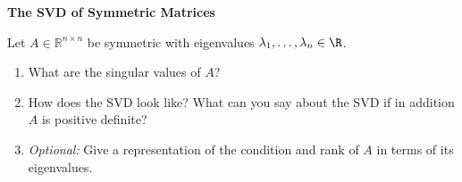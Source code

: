 \textbf{\normalsize The SVD of Symmetric Matrices}

Let $A\in \mathbb{R}^{n\times n}$ be symmetric with eigenvalues $\lambda_1, \ldots, \lambda_n \in \R$.
\begin{enumerate}
	\item What are the singular values of $A$?
	\item How does the SVD look like? What can you say about the SVD if in addition $A$ is positive definite?
	\item \textit{Optional:} Give a representation of the condition and rank of $A$ in terms of its eigenvalues.
\end{enumerate} 